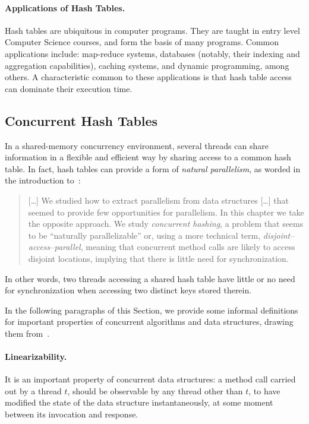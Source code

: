 \paragraph{Applications of Hash Tables.}\label{par:applications-of-hash-tables}

Hash tables are ubiquitous in computer programs.
They are taught in entry level Computer Science courses, and form the basis of many programs.
Common applications include: map-reduce systems, databases (notably, their indexing and aggregation capabilities), caching systems, and dynamic programming, among others.
A characteristic common to these applications is that hash table access can dominate their execution time.


\subsection{Concurrent Hash Tables}\label{subsec:concurrent-hash-tables}

In a shared-memory concurrency environment, several threads can share information in a flexible and efficient way by sharing access to a common hash table.
In fact, hash tables can provide a form of \emph{natural parallelism}, as worded in the introduction to~\cite[Chapter~13]{art-mp}:
\begin{quote}
    [\ldots] We studied how to extract parallelism from data structures [\ldots] that seemed to provide few opportunities for parallelism.
    In this chapter we take the opposite approach.
    We study \emph{{concurrent hashing}}, a problem that seems to be ``naturally parallelizable'' or, using a more technical term, \emph{{disjoint--access--parallel}}, meaning that concurrent method calls are likely to access disjoint locations, implying that there is little need for synchronization.
\end{quote}
In other words, two threads accessing a shared hash table have little or no need for synchronization when accessing two distinct keys stored therein.

In the following paragraphs of this Section, we provide some informal definitions for important properties of concurrent algorithms and data structures, drawing them from~\cite[]{art-mp}.

\paragraph{Linearizability.}
It is an important property of concurrent data structures: a method call carried out by a thread $t$, should be observable by any thread other than $t$, to have modified the state of the data structure instantaneously, at some moment between its invocation and response.

